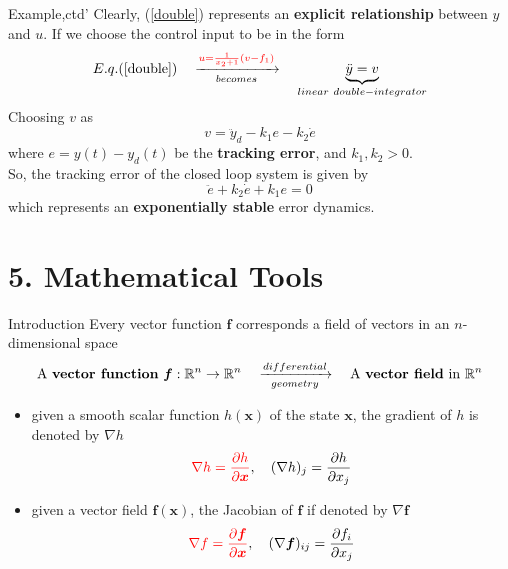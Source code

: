 \documentclass{beamer}
\renewcommand{\vec}[1]{\ensuremath{\boldsymbol{#1}}} %
\begin{document}
\begin{frame}{Example,ctd'}
    Clearly, (\ref{double}) represents an \textbf{explicit relationship} between $y$ and $u$.  If we choose the control input to be in the form
    $$
        E.q.(\ref{double}) \quad \xrightarrow[becomes]{ {\color{red}u=\frac{1}{x_{2}+1}\left(v-f_{1}\right)}} \quad \underbrace{\ddot{y} = v}_{linear~double-integrator}
    $$
Choosing $v$ as
\begin{equation}\label{choose-v}
  v = \ddot{y}_{d}-k_{1}e-k_{2}\dot{e}
\end{equation}
where $e=y(t)-y_{d}(t)$ be the \textbf{tracking error}, and $k_{1}, k_{2} > 0$.\\
So, the tracking error of the closed loop system is given by
$$
\ddot{e}+k_{2} \dot{e}+k_{1} e=0
$$
which represents an \textbf{exponentially stable} error dynamics.
\end{frame}


\section{5. Mathematical Tools}

\begin{frame}{Introduction}
Every vector function \vec{f} corresponds a field of vectors in an $n$-dimensional space
$$
\text{A \textbf{vector function}}~\vec{f}:\mathbb{R}^{n}\rightarrow \mathbb{R}^{n} \quad \xrightarrow[geometry]{differential} \quad \text{A \textbf{vector field} in}~\mathbb{R}^{n}
$$

\begin{itemize}
  \item given a smooth scalar function $h(\vec{x})$ of the state \vec{x}, the gradient of $h$ is denoted by $\nabla h$
      $$
      {\color{red}\nabla h = \frac{\partial h}{\partial \vec{x}}}, \quad (\nabla h)_{j} = \frac{\partial h}{\partial x_{j}}
      $$
  \item given a vector field $\vec{f}(\vec{x})$, the Jacobian of \vec{f} if denoted by $\nabla \vec{f}$
      $$
      {\color{red}\nabla f = \frac{\partial \vec{f}}{\partial \vec{x}}}, \quad (\nabla \vec{f})_{ij} = \frac{\partial f_{i}}{\partial x_{j}}
      $$
\end{itemize}
\end{frame}
\end{document}

